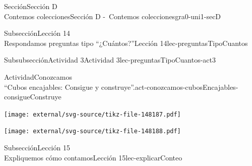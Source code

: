 \begin{sectionptx}{Sección}{{\Large Sección D\\}Contemos colecciones}{}{Sección D -~Contemos colecciones}{}{}{gra0-uni1-secD}
\begin{subsectionptx}{Subsección}{{\normalsize Lección 14\\[-0.05cm]}Respondamos preguntas tipo “¿Cuántos?”}{}{Lección 14}{}{}{lec-preguntasTipoCuantos}
%
%
%
\typeout{************************************************}
\typeout{************************************************}
%
%
%
\typeout{************************************************}
\typeout{************************************************}
%
\begin{subsubsectionptx}{Subsubsección}{Actividad 3}{}{Actividad 3}{}{}{lec-preguntasTipoCuantos-act3}
\begin{activity}{Actividad}{Conozcamos\\“Cubos encajables: Consigue y construye”.}{act-conozcamos-cubosEncajables-consigueConstruye}%
\begin{image}{0}{1}{0}{}%
\texttt{[image: external/svg-source/tikz-file-148187.pdf]}
\end{image}%
\begin{image}{0}{1}{0}{}%
\texttt{[image: external/svg-source/tikz-file-148188.pdf]}
\end{image}%
\end{activity}%
\end{subsubsectionptx}
\end{subsectionptx}
%
%
\typeout{************************************************}
\typeout{************************************************}
%
\begin{subsectionptx}{Subsección}{{\normalsize Lección 15\\[-0.05cm]}Expliquemos cómo contamos}{}{Lección 15}{}{}{lec-explicarConteo}
\begin{introduction}{}%

\end{introduction}
\end{subsectionptx}
\end{sectionptx}
